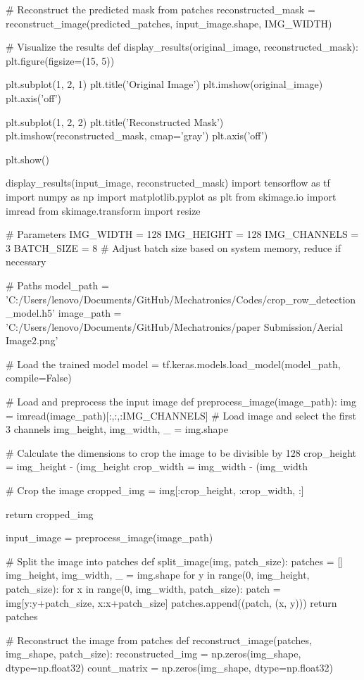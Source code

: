 \documentclass[conference]{IEEEtran}
\begin{document}
# Reconstruct the predicted mask from patches
reconstructed_mask = reconstruct_image(predicted_patches, input_image.shape, IMG_WIDTH)

# Visualize the results
def display_results(original_image, reconstructed_mask):
plt.figure(figsize=(15, 5))

plt.subplot(1, 2, 1)
plt.title('Original Image')
plt.imshow(original_image)
plt.axis('off')

plt.subplot(1, 2, 2)
plt.title('Reconstructed Mask')
plt.imshow(reconstructed_mask, cmap='gray')
plt.axis('off')

plt.show()

display_results(input_image, reconstructed_mask)
import tensorflow as tf
import numpy as np
import matplotlib.pyplot as plt
from skimage.io import imread
from skimage.transform import resize

# Parameters
IMG_WIDTH = 128
IMG_HEIGHT = 128
IMG_CHANNELS = 3
BATCH_SIZE = 8  # Adjust batch size based on system memory, reduce if necessary

# Paths
model_path = 'C:/Users/lenovo/Documents/GitHub/Mechatronics/Codes/crop_row_detection_model.h5'
image_path = 'C:/Users/lenovo/Documents/GitHub/Mechatronics/paper Submission/Aerial Image2.png'

# Load the trained model
model = tf.keras.models.load_model(model_path, compile=False)

# Load and preprocess the input image
def preprocess_image(image_path):
img = imread(image_path)[:,:,:IMG_CHANNELS]  # Load image and select the first 3 channels
img_height, img_width, _ = img.shape

# Calculate the dimensions to crop the image to be divisible by 128
crop_height = img_height - (img_height %
crop_width = img_width - (img_width %

# Crop the image
cropped_img = img[:crop_height, :crop_width, :]

return cropped_img

input_image = preprocess_image(image_path)

# Split the image into patches
def split_image(img, patch_size):
patches = []
img_height, img_width, _ = img.shape
for y in range(0, img_height, patch_size):
for x in range(0, img_width, patch_size):
patch = img[y:y+patch_size, x:x+patch_size]
patches.append((patch, (x, y)))
return patches

# Reconstruct the image from patches
def reconstruct_image(patches, img_shape, patch_size):
reconstructed_img = np.zeros(img_shape, dtype=np.float32)
count_matrix = np.zeros(img_shape, dtype=np.float32)
\end{document}
